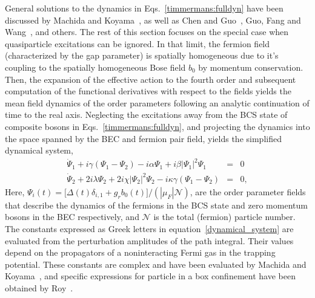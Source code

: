 \documentclass[aps,pra,floats,epsfig,pdflatex]{revtex4}                                                              %
\begin{document}
General solutions to the dynamics in Eqs.~\ref{timmermans:fulldyn} have been discussed by Machida and Koyama~\cite{machida:dynamics}, as well as 
Chen and Guo~\cite{weaksols}, Guo, Fang and Wang~\cite{travellingsols}, and others. The rest of this section focuses on the special case when quasiparticle excitations can be ignored. In that limit, the fermion field (characterized by the gap parameter) is spatially homogeneous due to it's coupling  to the spatially homogeneous Bose field $b_0$ by momentum conservation. Then, the expansion of the effective action to the fourth order and subsequent computation of the functional derivatives with respect to the fields yields the mean field dynamics of the order parameters following an analytic continuation of time to the real axis. Neglecting the excitations away from the BCS state of composite bosons in Eqs.~\ref{timmermans:fulldyn}, and projecting the dynamics into the space spanned by the BEC and fermion pair field, yields the simplified dynamical system,
\begin{eqnarray}
\label{dynamical_system}
\dot \Psi_1 + i\gamma \left( \Psi_1-\Psi_2 \right) - i\alpha \Psi_1 +i\beta |\Psi_1|^2 \Psi_1 &=& 0 \nonumber \\
\dot \Psi_2 +2 i \lambda \Psi_2 +2 i\chi|\Psi_2|^2\Psi_2 - i\kappa\gamma \left(\Psi_1-\Psi_2 \right) &=& 0,
\end{eqnarray}
Here, $\Psi_i(t)=\big[\Delta(t)\delta_{i,1}+g_r b_0(t)\big]/\left(|\mu_F|\mathcal{N}\right)$, are the order parameter fields that describe the dynamics of the fermions in the BCS state and zero momentum bosons in the BEC respectively, and $\mathcal{N}$ is the total (fermion) particle number. The constants expressed as Greek letters in equation~\ref{dynamical_system} are evaluated from the perturbation amplitudes of the path integral. Their values depend on the propagators of a noninteracting Fermi gas in the trapping potential. These constants are complex and have been evaluated by Machida and Koyama~\cite{machida:dynamics}, and specific expressions for particle in a box confinement have been obtained by Roy~\cite{mypaper4}. 
\end{document}
